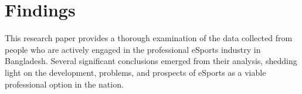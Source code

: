 \documentclass[manuscript,screen,review,anonymous]{acmart}
\begin{document}




\section{Findings}
This research paper provides a thorough examination of the data collected from people who are actively engaged in the professional eSports industry in Bangladesh. Several significant conclusions emerged from their analysis, shedding light on the development, problems, and prospects of eSports as a viable professional option in the nation.
\end{document}
